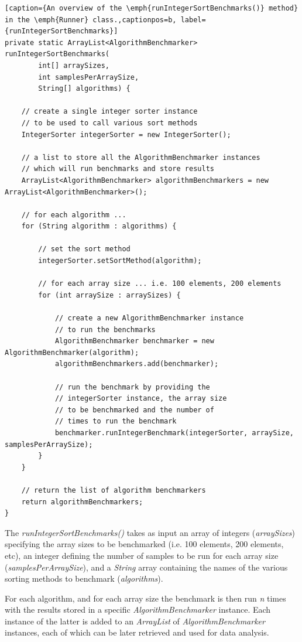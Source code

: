 \documentclass[12pt,a4paper]{article}
\begin{document}
\begin{lstlisting}[caption={An overview of the \emph{runIntegerSortBenchmarks()} method} in the \emph{Runner} class.,captionpos=b, label={runIntegerSortBenchmarks}]
private static ArrayList<AlgorithmBenchmarker> runIntegerSortBenchmarks(
		int[] arraySizes, 
		int samplesPerArraySize,
		String[] algorithms) {
	
	// create a single integer sorter instance
	// to be used to call various sort methods
	IntegerSorter integerSorter = new IntegerSorter();

	// a list to store all the AlgorithmBenchmarker instances
	// which will run benchmarks and store results
	ArrayList<AlgorithmBenchmarker> algorithmBenchmarkers = new ArrayList<AlgorithmBenchmarker>();

	// for each algorithm ...
	for (String algorithm : algorithms) {

		// set the sort method
		integerSorter.setSortMethod(algorithm);

		// for each array size ... i.e. 100 elements, 200 elements
		for (int arraySize : arraySizes) {
			
			// create a new AlgorithmBenchmarker instance
			// to run the benchmarks
			AlgorithmBenchmarker benchmarker = new AlgorithmBenchmarker(algorithm);
			algorithmBenchmarkers.add(benchmarker);

			// run the benchmark by providing the 
			// integerSorter instance, the array size
			// to be benchmarked and the number of
			// times to run the benchmark
			benchmarker.runIntegerBenchmark(integerSorter, arraySize, samplesPerArraySize);					
		}
	}

	// return the list of algorithm benchmarkers
	return algorithmBenchmarkers;
}
\end{lstlisting}

\clearpage

The \emph{runIntegerSortBenchmarks()} takes as input an array of integers (\emph{arraySizes}) specifying the array sizes to be benchmarked (i.e. 100 elements, 200 elements, etc), an integer defining the number of samples to be run for each array size (\emph{samplesPerArraySize}), and a \emph{String} array containing the names of the various sorting methods to benchmark (\emph{algorithms}). 

For each algorithm, and for each array size the benchmark is then run \emph{n} times with the results stored in a specific \emph{AlgorithmBenchmarker} instance. Each instance of the latter is added to an \emph{ArrayList} of \emph{AlgorithmBenchmarker} instances, each of which can be later retrieved and used for data analysis.
\end{document}

